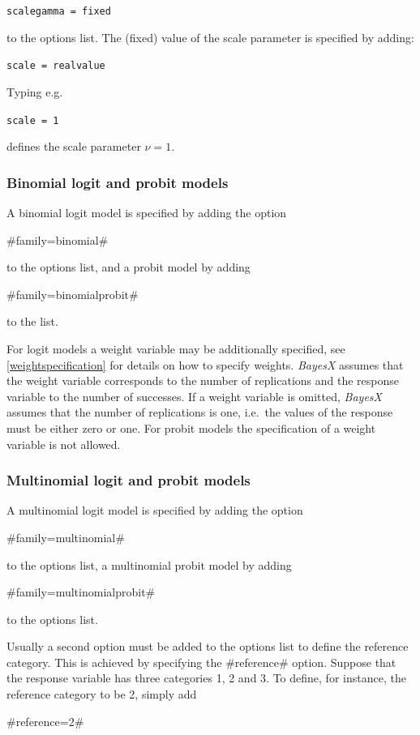 {\tt scalegamma = fixed}

to the options list. The (fixed) value of the scale parameter is
specified by adding:

{\tt scale = realvalue}

Typing e.g.

{\tt scale = 1}

defines the scale parameter $\nu=1$.


\subsubsection*{Binomial logit and probit models}

A binomial logit model is specified by adding the option

#family=binomial#

to the options list, and a probit model by adding

#family=binomialprobit#

to the list.

For logit models a weight variable may be additionally specified,
see \autoref{weightspecification} for details on how to specify
weights. {\em BayesX} assumes that the weight variable corresponds
to the number of replications and the response variable to the
number of successes. If a weight variable is omitted, {\em BayesX}
assumes that the number of replications is one, i.e.~the values of
the response must be either zero or one. For probit models the
specification of a weight variable is not allowed.


\subsubsection*{Multinomial logit and probit models}

A multinomial logit model is specified by adding the option

#family=multinomial#

to the options list, a multinomial probit model by adding

#family=multinomialprobit#

to the options list.

Usually a second option must be added to the options list to
define the reference category. This is achieved by specifying the
#reference# option. Suppose that the response variable has three
categories 1, 2 and 3. To define, for instance, the reference
category to be 2, simply add

#reference=2#

